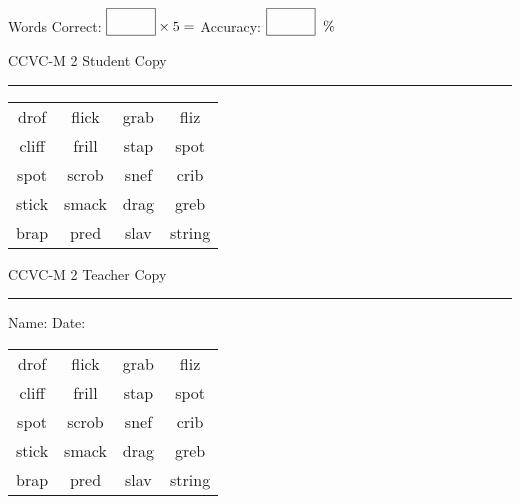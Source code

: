 \documentclass{memoir}
\begin{document}
\small

Words Correct: $\fbox{\phantom{\huge 100}} \times 5 = $ Accuracy: $\fbox{\phantom{\huge 100}}\;\; \%$ 

\vfill

\newpage


\footnotesize \noindent
CCVC-M 2 \hfill Student Copy
\smallskip
\hrule

\Large

\setlength{\tabcolsep}{14pt}
\def\arraystretch{3}

{\selectfont


\begin{vplace}[0.5]
\begin{center}
\begin{tabular}{cccc}
drof & flick            & grab                    & fliz \\
cliff            & frill & stap & spot \\
spot & scrob & snef & crib \\
stick & smack & drag        & greb \\
brap               & pred & slav & string \\
\end{tabular}
\end{center}
\end{vplace}

}

\newpage

\footnotesize \noindent
CCVC-M 2 \hfill Teacher Copy
\smallskip
\hrule

\small

\vfill

\noindent
Name: \underline{\hspace{1.75in}} \hfill Date: \underline{\hspace{1in}}

\Large

{\selectfont


\begin{vplace}[0.5]
\begin{center}
\begin{tabular}{cccc}
drof & flick            & grab                    & fliz \\
cliff            & frill & stap & spot \\
spot & scrob & snef & crib \\
stick & smack & drag        & greb \\
brap               & pred & slav & string \\
\end{tabular}
\end{center}
\end{vplace}



}
\end{document}
